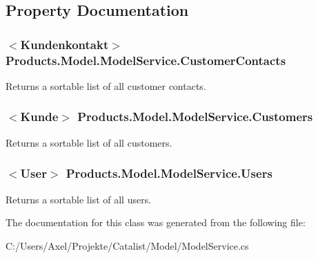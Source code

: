 \subsection{Property Documentation}
\subsubsection[{\texorpdfstring{Customer\+Contacts}{CustomerContacts}}]{$<${\bf Kundenkontakt}$>$ Products.\+Model.\+Model\+Service.\+Customer\+Contacts\hspace{0.3cm}{\ttfamily [get]}}\hypertarget{class_products_1_1_model_1_1_model_service_acb1111cbb862c9e2587105bb089cffd3}{}\label{class_products_1_1_model_1_1_model_service_acb1111cbb862c9e2587105bb089cffd3}


Returns a sortable list of all customer contacts. 

\subsubsection[{\texorpdfstring{Customers}{Customers}}]{$<${\bf Kunde}$>$ Products.\+Model.\+Model\+Service.\+Customers\hspace{0.3cm}{\ttfamily [get]}}\hypertarget{class_products_1_1_model_1_1_model_service_a6bc595a6db4806b4dc3f37437204ab3b}{}\label{class_products_1_1_model_1_1_model_service_a6bc595a6db4806b4dc3f37437204ab3b}


Returns a sortable list of all customers. 

\subsubsection[{\texorpdfstring{Users}{Users}}]{$<${\bf User}$>$ Products.\+Model.\+Model\+Service.\+Users\hspace{0.3cm}{\ttfamily [get]}}\hypertarget{class_products_1_1_model_1_1_model_service_add1e4b44389974fbc5bfbf77f65d502f}{}\label{class_products_1_1_model_1_1_model_service_add1e4b44389974fbc5bfbf77f65d502f}


Returns a sortable list of all users. 



The documentation for this class was generated from the following file\+:\begin{DoxyCompactItemize}
\item 
C\+:/\+Users/\+Axel/\+Projekte/\+Catalist/\+Model/Model\+Service.\+cs\end{DoxyCompactItemize}
